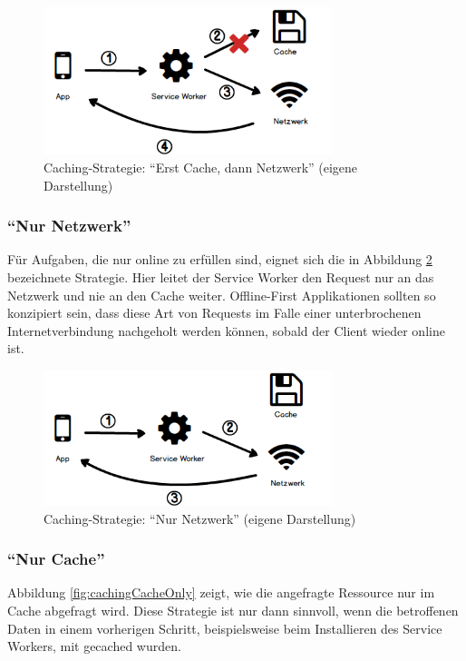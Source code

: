 \documentclass[a4paper, 12pt]{scrreprt}
\begin{document}
\begin{figure}[H]
	\centering
	\includegraphics[width=0.75\textwidth]{cachefirst.png}
	\caption[Caching-Strategie: \enquote{Erst Cache, dann Netzwerk}]{Caching-Strategie: \enquote{Erst Cache, dann Netzwerk} (eigene Darstellung)}
	\label{fig:cachingCacheFirst}
\end{figure}

\subsubsection{\enquote{Nur Netzwerk}}
Für Aufgaben, die nur online zu erfüllen sind, eignet sich die in Abbildung \ref{fig:cachingNetworkOnly} bezeichnete Strategie. Hier leitet der Service Worker den Request nur an das Netzwerk und nie an den Cache weiter. Offline-First Applikationen sollten so konzipiert sein, dass diese Art von Requests im Falle einer unterbrochenen Internetverbindung nachgeholt werden können, sobald der Client wieder online ist.

\begin{figure}[H]
	\centering
	\includegraphics[width=0.75\textwidth]{networkonly.png}
	\caption[Caching-Strategie: \enquote{Nur Netzwerk}]{Caching-Strategie: \enquote{Nur Netzwerk} (eigene Darstellung)}
	\label{fig:cachingNetworkOnly}
\end{figure}

\subsubsection{\enquote{Nur Cache}}
Abbildung \ref{fig:cachingCacheOnly} zeigt, wie die angefragte Ressource nur im Cache abgefragt wird. Diese Strategie ist nur dann sinnvoll, wenn die betroffenen Daten in einem vorherigen Schritt, beispielsweise beim Installieren des Service Workers, mit gecached wurden.
\end{document}
